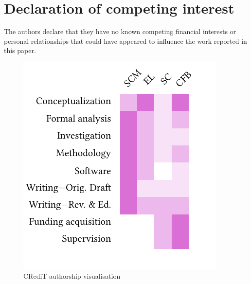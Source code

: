 \documentclass[a4paper,fleqn]{cas-dc}
\begin{document}
\section*{Declaration of competing interest}
The authors declare that they have no known competing financial interests or personal relationships that could have appeared to influence the work reported in this paper.

\printcredits



\begin{figure}[!htbp]
	\centering
	\includegraphics[width=0.8\columnwidth]{figs/T-reX_credit_heatmap.pdf}
	\caption{CRediT authorship visualisation}\label{fig:credit_heatmap}
\end{figure} 


%



\end{document}
